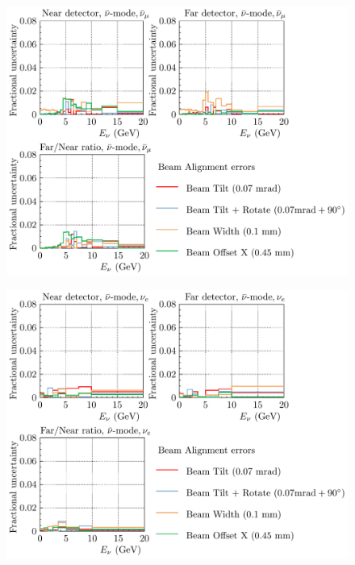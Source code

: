 \documentclass{article}
\begin{document}
\begin{figure}
  \includegraphics[width=\textwidth]{plots/fracerrs/nubarmode_numubar_BeamAlignment}
  \caption{}
  \label{fig:beamalign_nubar_numubar}
\end{figure}

\begin{figure}
  \includegraphics[width=\textwidth]{plots/fracerrs/nubarmode_nue_BeamAlignment}
  \caption{}
  \label{fig:beamalign_nubar_nue}
\end{figure}
\end{document}
